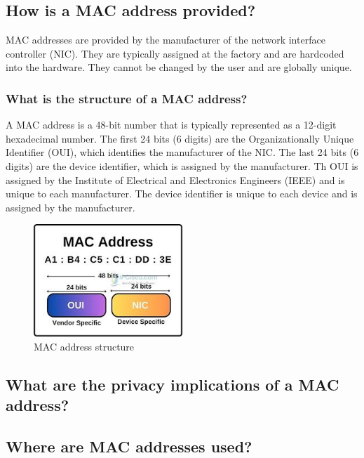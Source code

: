 \documentclass[aps,prb,twocolumn,superscriptaddress,floatfix,longbibliography,nofootinbib]{revtex4-2}
\begin{document}
  \subsection{\label{sec:Provided}How is a MAC address provided?}
  MAC addresses are provided by the manufacturer of the network interface controller (NIC).
  They are typically assigned at the factory and are hardcoded into the hardware.
  They cannot be changed by the user and are globally unique.
    \subsubsection{\label{sec:Structure}What is the structure of a MAC address?}
    A MAC address is a 48-bit number that is typically represented as a 12-digit hexadecimal number.
    The first 24 bits (6 digits) are the Organizationally Unique Identifier (OUI), 
    which identifies the manufacturer of the NIC.
    The last 24 bits (6 digits) are the device identifier, which is assigned by the manufacturer.
    Th OUI is assigned by the Institute of Electrical and Electronics Engineers (IEEE)
    and is unique to each manufacturer.
    The device identifier is unique to each device and is assigned by the manufacturer.
  \begin{figure}[H]
      \centering
      \includegraphics[width=0.5\textwidth]{pictures/mac.jpeg}
      \caption{MAC address structure \cite{MAC}}
      \label{fig:MAC}
  \end{figure}

  \subsection{\label{sec:Privacy}What are the privacy implications of a MAC address?}
  \subsection{\label{sec:Where}Where are MAC addresses used?}
\end{document}
